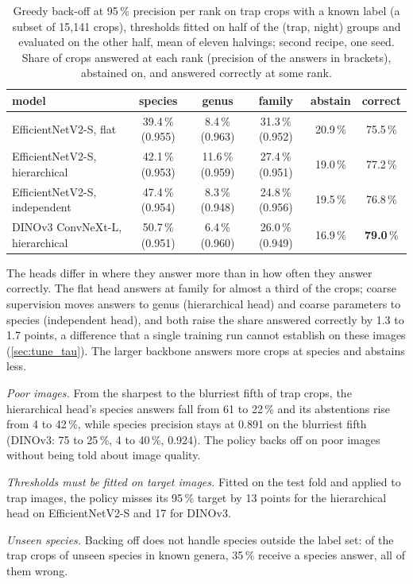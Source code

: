\begin{table}[htb]
    \centering
    \caption{Greedy back-off at 95\,\% precision per rank on trap crops with a known label (a subset of 15,141 crops), thresholds fitted on half of the (trap, night) groups and evaluated on the other half, mean of eleven halvings; second recipe, one seed. Share of crops answered at each rank (precision of the answers in brackets), abstained on, and answered correctly at some rank.}
    \label{tab:backoff}
    \begin{tabular}{lccccc}
        \toprule
        model & species & genus & family & abstain & correct \\
        \midrule
        EfficientNetV2-S, flat & 39.4\,\% (0.955) & 8.4\,\% (0.963) & 31.3\,\% (0.952) & 20.9\,\% & 75.5\,\% \\
        EfficientNetV2-S, hierarchical & 42.1\,\% (0.953) & 11.6\,\% (0.959) & 27.4\,\% (0.951) & 19.0\,\% & 77.2\,\% \\
        EfficientNetV2-S, independent & 47.4\,\% (0.954) & 8.3\,\% (0.948) & 24.8\,\% (0.956) & 19.5\,\% & 76.8\,\% \\
        DINOv3 ConvNeXt-L, hierarchical & 50.7\,\% (0.951) & 6.4\,\% (0.960) & 26.0\,\% (0.949) & 16.9\,\% & \textbf{79.0}\,\% \\
        \bottomrule
    \end{tabular}
\end{table}

The heads differ in where they answer more than in how often they answer correctly.
The flat head answers at family for almost a third of the crops; coarse supervision moves answers to genus (hierarchical head) and coarse parameters to species (independent head), and both raise the share answered correctly by 1.3 to 1.7 points, a difference that a single training run cannot establish on these images (\cref{sec:tune_tau}).
The larger backbone answers more crops at species and abstains less.

\emph{Poor images.} From the sharpest to the blurriest fifth of trap crops, the hierarchical head's species answers fall from 61 to 22\,\% and its abstentions rise from 4 to 42\,\%, while species precision stays at 0.891 on the blurriest fifth (DINOv3: 75 to 25\,\%, 4 to 40\,\%, 0.924).
The policy backs off on poor images without being told about image quality.

\emph{Thresholds must be fitted on target images.} Fitted on the test fold and applied to trap images, the policy misses its 95\,\% target by 13 points for the hierarchical head on EfficientNetV2-S and 17 for DINOv3.

\emph{Unseen species.} Backing off does not handle species outside the label set: of the trap crops of unseen species in known genera, 35\,\% receive a species answer, all of them wrong.
